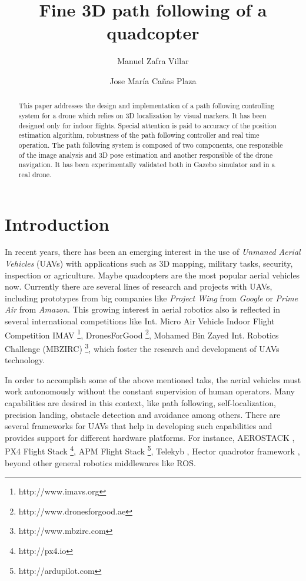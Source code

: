 \documentclass{styles/svproc}
\begin{document}
\title{Fine 3D path following of a quadcopter}
\author{Manuel Zafra Villar \and Jose María Cañas Plaza}
\maketitle

\begin{abstract}
This paper addresses the design and implementation of a path following controlling system for a drone which relies on 3D localization by visual markers. It has been designed only for indoor flights. Special attention is paid to accuracy of the position estimation algorithm, robustness of the path following controller and real time operation. The path following system is composed of two components, one responsible of the image analysis and 3D pose estimation and another responsible of the drone navigation. It has been experimentally validated both in Gazebo simulator and in a real drone. 
\end{abstract}

\section{Introduction}

	In recent years, 
there has been an emerging interest in the use of \textit{Unmaned Aerial Vehicles} (UAVs) with applications such as 3D mapping, military tasks, security, inspection \cite{nikolic2014} or agriculture. Maybe quadcopters are the most popular aerial vehicles now. Currently there are several lines of research and projects with UAVs, including prototypes from big companies like \textit{Project Wing} from \textit{Google} or \textit{Prime Air} from \textit{Amazon}. 
        This growing interest in aerial robotics also is reflected in several international competitions like Int. Micro Air Vehicle Indoor Flight Competition IMAV \footnote{http://www.imavs.org}, DronesForGood \footnote{http://www.dronesforgood.ae}, Mohamed Bin Zayed Int. Robotics Challenge (MBZIRC) \footnote{http://www.mbzirc.com}, which foster the research and development of UAVs technology.


	In order to accomplish some of the above mentioned taks, the aerial vehicles must work autonomously without the constant supervision of human operators. Many capabilities are desired in this context, like path following, self-localization, precision landing, obstacle detection and avoidance among others. There are several frameworks for UAVs that help in developing such capabilities and provides support for different hardware platforms. For instance, AEROSTACK \cite{sanchezlopez2016}, PX4 Flight Stack \footnote{http://px4.io}, APM Flight Stack \footnote{http://ardupilot.com}, Telekyb \cite{grabe2013}, Hector quadrotor framework \cite{kohlbrecher2014}, beyond other general robotics middlewares like ROS.
\end{document}
